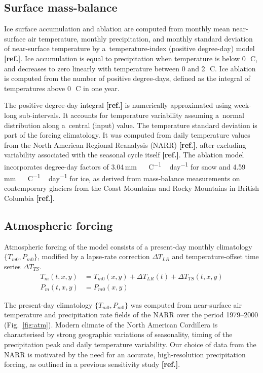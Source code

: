 \documentclass[tc, ms]{copernicus}
\newcommand{\aref}[0]{\textbf{[ref.]}}
\renewcommand{\citep}[1]{\aref}
\renewcommand{\citet}[1]{\aref}
\begin{document}
\subsection{Surface mass-balance}

Ice surface accumulation and ablation are computed from monthly mean
near-surface air temperature, monthly precipitation, and monthly standard
deviation of near-surface temperature by a~temperature-index (positive
degree-day) model \citep{hock-2003}. Ice accumulation is equal to precipitation
when temperature is below 0\,\unit{{\degree}C}, and decreases to zero linearly
with temperature between 0 and 2\,\unit{{\degree}C}. Ice ablation is computed
from the number of positive degree-days, defined as the integral of
temperatures above 0\,\unit{{\degree}C} in one year.

The positive degree-day integral \citep{calov-greve-2005} is numerically
approximated using week-long sub-intervals. It accounts for temperature
variability assuming a~normal distribution along a~central (input) value. The
temperature standard deviation is part of the forcing climatology. It was
computed from daily temperature values from the North American Regional
Reanalysis (NARR) \citep{data:narr}, after excluding variability associated
with the
seasonal cycle itself \citet{seguinot-rogozhina-2014}. The
ablation model incorporates degree-day factors of
3.04\,\unit{mm\,{\degree}C^{-1}\,day^{-1}} for snow and
4.59\,\unit{mm\,{\degree}C^{-1}\,day^{-1}} for ice, as derived from
mass-balance measurements on contemporary glaciers from the Coast Mountains and
Rocky Mountains in British Columbia \citep{shea-etal-2009}.

\subsection{Atmospheric forcing}

Atmospheric forcing of the model consists of a present-day monthly climatology
$\{T_{m0}, P_{m0}\}$, modified by a lapse-rate correction ${\Delta}T_{LR}$ and
temperature-offset time series ${\Delta}T_{TS}$.
\begin{align}
    T_m(t, x, y) &= T_{m0}(x, y) + {\Delta}T_{LR}(t) + {\Delta}T_{TS}(t, x, y) \\
    P_m(t, x, y) &= P_{m0}(x, y)
\end{align}

The present-day climatology $\{T_{m0}, P_{m0}\}$ was computed from
near-surface air temperature and precipitation rate fields of the NARR over
the period 1979--2000 (Fig.~\ref{fig:atm}). Modern climate of the North
American Cordillera is characterised by strong geographic variations of
seasonality, timing of the precipitation peak and daily temperature variability.
Our choice of data from the NARR is motivated by the need for an accurate,
high-resolution precipitation forcing, as outlined in a previous sensitivity
study \aref.
\end{document}
